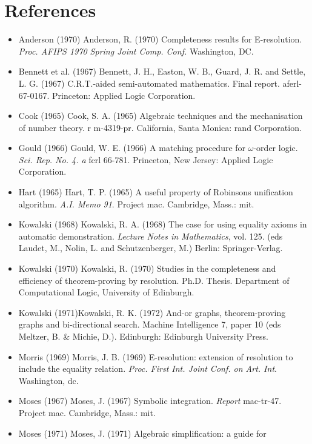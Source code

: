 \documentclass[letterpaper]{report}
\begin{document}
\section*{References}\label{references}

\begin{itemize}[label={}, itemsep=8pt]
	\item
	Anderson (1970) Anderson, R. (1970) Completeness results for
	E-resolution. \emph{Proc. AFIPS 1970 Spring Joint Comp. Conf.}
	Washington, DC.
	\item
	Bennett et al. (1967) Bennett, J. H., Easton, W. B., Guard, J. R. and
	Settle, L. G. (1967) C.R.T.-aided semi-automated mathematics. Final
	report. aferl-67-0167. Princeton: Applied Logic Corporation.
	\item
	Cook (1965) Cook, S. A. (1965) Algebraic techniques and the
	mechanisation of number theory. r m-4319-pr. California, Santa Monica:
	rand Corporation.
	\item
	Gould (1966) Gould, W. E. (1966) A matching procedure for
	$\omega$-order logic. \emph{Sci. Rep. No. 4. a} fcrl 66-781.
	Princeton, New Jersey: Applied Logic Corporation.
	\item
	Hart (1965) Hart, T. P. (1965) A useful property of
	Robinson\textquotesingle s unification algorithm. \emph{A.I. Memo 91}.
	Project mac. Cambridge, Mass.: mit.
	\item
	Kowalski (1968) Kowalski, R. A. (1968) The case for using equality
	axioms in automatic demonstration. \emph{Lecture Notes in
		Mathematics}, vol. 125. (eds Laudet, M., Nolin, L. and Schutzenberger,
	M.) Berlin: Springer-Verlag.
	\item
	Kowalski (1970) Kowalski, R. (1970) Studies in the completeness and
	efficiency of theorem-proving by resolution. Ph.D. Thesis. Department
	of Computational Logic, University of Edinburgh.
	\item
	Kowalski (1971)Kowalski, R. K. (1972) And-or graphs, theorem-proving
	graphs and bi-directional search. Machine Intelligence 7, paper 10
	(eds Meltzer, B. \& Michie, D.). Edinburgh: Edinburgh University
	Press.
	\item
	Morris (1969) Morris, J. B. (1969) E-resolution: extension of
	resolution to include the equality relation. \emph{Proc. First Int.
		Joint Conf. on Art. Int}. Washington, dc.
	\item
	Moses (1967) Moses, J. (1967) Symbolic integration. \emph{Report}
	mac-tr-47. Project mac. Cambridge, Mass.: mit.
	\item
	Moses (1971) Moses, J. (1971) Algebraic simplification: a guide for

\end{itemize}
\end{document}
